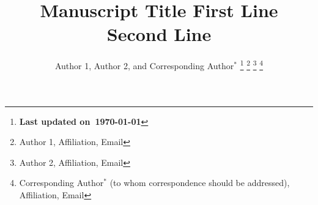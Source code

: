 \documentclass[journal]{IEEEtran}
\begin{document}
\title{\huge Manuscript Title First Line\\Second Line}
\author{
  Author 1, Author 2, and
  Corresponding Author$^{\ast}$%
  \thanks{\bf Last updated on~\today{}}
  \thanks{Author 1, 
    Affiliation, Email}
  \thanks{Author 2, 
    Affiliation, Email}
  \thanks{Corresponding Author$^{\ast}$
    (to whom correspondence should be addressed),
    Affiliation, Email}
}

\maketitle

\begin{abstract}
	
\end{abstract}

\IEEEpeerreviewmaketitle





\end{document}
